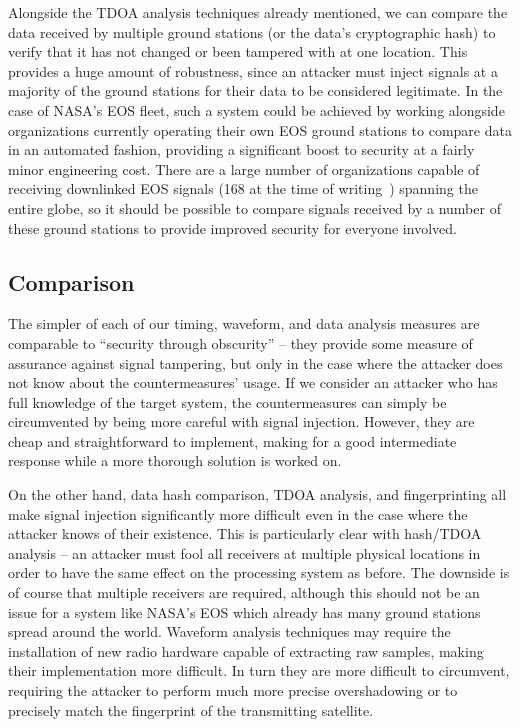 
Alongside the TDOA analysis techniques already mentioned, we can compare the data received by multiple ground stations (or the data's cryptographic hash) to verify that it has not changed or been tampered with at one location.
This provides a huge amount of robustness, since an attacker must inject signals at a majority of the ground stations for their data to be considered legitimate.
In the case of NASA's EOS fleet, such a system could be achieved by working alongside organizations currently operating their own EOS ground stations to compare data in an automated fashion, providing a significant boost to security at a fairly minor engineering cost.
There are a large number of organizations capable of receiving downlinked EOS signals (168 at the time of writing~\cite{nasaDirect}) spanning the entire globe, so it should be possible to compare signals received by a number of these ground stations to provide improved security for everyone involved.


\subsection{Comparison}

The simpler of each of our timing, waveform, and data analysis measures are comparable to ``security through obscurity'' -- they provide some measure of assurance against signal tampering, but only in the case where the attacker does not know about the countermeasures' usage.
If we consider an attacker who has full knowledge of the target system, the countermeasures can simply be circumvented by being more careful with signal injection.
However, they are cheap and straightforward to implement, making for a good intermediate response while a more thorough solution is worked on.

On the other hand, data hash comparison, TDOA analysis, and fingerprinting all make signal injection significantly more difficult even in the case where the attacker knows of their existence.
This is particularly clear with hash/TDOA analysis -- an attacker must fool all receivers at multiple physical locations in order to have the same effect on the processing system as before.
The downside is of course that multiple receivers are required, although this should not be an issue for a system like NASA's EOS which already has many ground stations spread around the world.
Waveform analysis techniques may require the installation of new radio hardware capable of extracting raw samples, making their implementation more difficult.
In turn they are more difficult to circumvent, requiring the attacker to perform much more precise overshadowing or to precisely match the fingerprint of the transmitting satellite.

